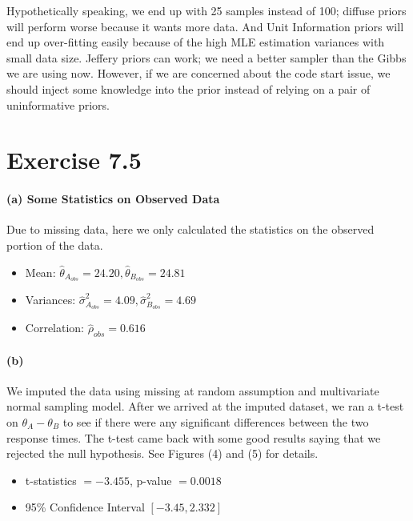 \documentclass[11pt, letterpaper]{article}
\begin{document}
Hypothetically speaking, we end up with 25 samples instead of 100; diffuse priors will perform worse because it wants more data. And Unit Information priors will end up over-fitting easily because of the high MLE estimation variances with small data size. Jeffery priors can work; we need a better sampler than the Gibbs we are using now. However, if we are concerned about the code start issue, we should inject some knowledge into the prior instead of relying on a pair of uninformative priors.


\section{Exercise 7.5}
\paragraph{(a) Some Statistics on Observed Data}
Due to missing data, here we only calculated the statistics on the observed portion of the data.
\begin{itemize}
    \item Mean: $\hat{\theta}_{A_{obs}} = 24.20, \hat{\theta}_{B_{obs}} = 24.81$
    \item Variances: $\hat{\sigma}^2_{A_{obs}} = 4.09, \hat{\sigma}^2_{B_{obs}} = 4.69$
    \item Correlation: $\hat{\rho}_{obs} = 0.616$
\end{itemize}

\paragraph{(b)}
We imputed the data using missing at random assumption and multivariate normal sampling model. After we arrived at the imputed dataset, we ran a t-test on $\theta_A - \theta_B$ to see if there were any significant differences between the two response times. The t-test came back with some good results saying that we rejected the null hypothesis. See Figures (4) and (5) for details.
\begin{itemize}
    \item t-statistics $= -3.455$, p-value $= 0.0018$
    \item 95\% Confidence Interval $[-3.45, 2.332]$
\end{itemize}
\end{document}
